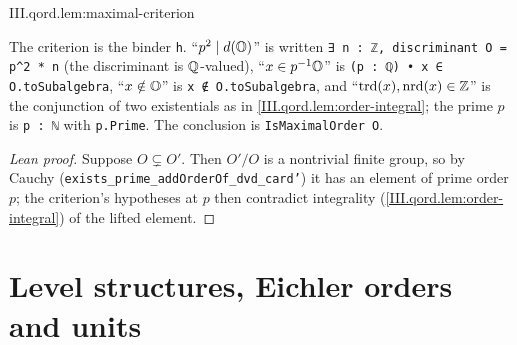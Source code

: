 \begin{lemma}
\end{lemma}
\begin{tfformal}{III.qord.lem:maximal-criterion}
\begin{tffidelity}
The criterion is the binder \texttt{h}. ``$p^2\mid d(\mathbb{O})$'' is written \texttt{∃ n : ℤ, discriminant O = p\^{}2 * n} (the discriminant is $\mathbb{Q}$-valued), ``$x\in p^{-1}\mathbb{O}$'' is \texttt{(p : ℚ) • x ∈ O.toSubalgebra}, ``$x\notin\mathbb{O}$'' is \texttt{x ∉ O.toSubalgebra}, and ``$\operatorname{trd}(x),\operatorname{nrd}(x)\in\mathbb{Z}$'' is the conjunction of two existentials as in \cref{III.qord.lem:order-integral}; the prime $p$ is \texttt{p : ℕ} with \texttt{p.Prime}. The conclusion is \texttt{IsMaximalOrder O}.
\end{tffidelity}
\end{tfformal}
\begin{proof}[Lean proof]
Suppose $O\subsetneq O'$. Then $O'/O$ is a nontrivial finite group, so by Cauchy (\texttt{exists\_prime\_addOrderOf\_dvd\_card'}) it has an element of prime order $p$; the criterion's hypotheses at $p$ then contradict integrality (\cref{III.qord.lem:order-integral}) of the lifted element.
\end{proof}


\section{Level structures, Eichler orders and units}\label{sec:qord-eichler}


